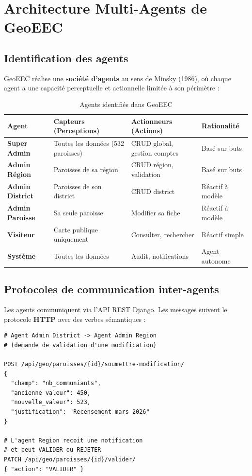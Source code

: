 \documentclass[12pt, a4paper]{report}
\theoremstyle{definition}
\begin{document}
\chapter{Architecture Multi-Agents de GeoEEC}

\section{Identification des agents}

GeoEEC réalise une \textbf{société d'agents} au sens de Minsky (1986), où chaque agent a une capacité perceptuelle et actionnelle limitée à son périmètre :

\begin{table}[H]
\centering
\caption{Agents identifiés dans GeoEEC}
\begin{tabularx}{\textwidth}{>{\bfseries}l X X X}
\toprule
Agent & Capteurs (Perceptions) & Actionneurs (Actions) & Rationalité \\
\midrule
Super Admin & Toutes les données (532 paroisses) & CRUD global, gestion comptes & Basé sur buts \\
Admin Région & Paroisses de sa région & CRUD région, validation & Basé sur buts \\
Admin District & Paroisses de son district & CRUD district & Réactif à modèle \\
Admin Paroisse & Sa seule paroisse & Modifier sa fiche & Réactif à modèle \\
Visiteur & Carte publique uniquement & Consulter, rechercher & Réactif simple \\
Système & Toutes les données & Audit, notifications & Agent autonome \\
\bottomrule
\end{tabularx}
\end{table}

\section{Protocoles de communication inter-agents}

Les agents communiquent via l'API REST Django. Les messages suivent le protocole \textbf{HTTP} avec des verbes sémantiques :

\begin{lstlisting}[caption=Protocole de communication inter-agents]
# Agent Admin District -> Agent Admin Region
# (demande de validation d'une modification)

POST /api/geo/paroisses/{id}/soumettre-modification/
{
  "champ": "nb_communiants",
  "ancienne_valeur": 450,
  "nouvelle_valeur": 523,
  "justification": "Recensement mars 2026"
}

# L'agent Region recoit une notification
# et peut VALIDER ou REJETER
PATCH /api/geo/paroisses/{id}/valider/
{ "action": "VALIDER" }
\end{lstlisting}
\end{document}
